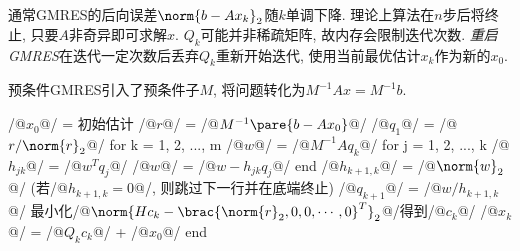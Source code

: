 \documentclass[20pt]{extarticle}
\begin{document}
通常GMRES的后向误差$\norm{b-Ax_k}_2$随$k$单调下降. 理论上算法在$n$步后将终止, 只要$A$非奇异即可求解$x$. $Q_k$可能并非稀疏矩阵, 故内存会限制迭代次数. \emph{重启GMRES}在迭代一定次数后丢弃$Q_k$重新开始迭代, 使用当前最优估计$x_k$作为新的$x_0$.
\par
预条件GMRES引入了预条件子$M$, 将问题转化为$M^{-1}Ax = M^{-1}b$.
\begin{matlablst}
/@$x_0$@/ = 初始估计
/@$r$@/ = /@$M^{-1}\pare{b - Ax_0}$@/
/@$q_1$@/ = /@$r/\norm{r}_2$@/
for k = 1, 2, ..., m
    /@$w$@/ = /@$M^{-1}Aq_k$@/
    for j = 1, 2, ..., k
        /@$h_{jk}$@/ = /@$w^T q_j$@/
        /@$w$@/ = /@$w - h_{jk}q_j$@/
    end
    /@$h_{k+1,k}$@/ = /@$\norm{w}_2$@/ (若/@$h_{k+1,k} = 0$@/, 则跳过下一行并在底端终止)
    /@$q_{k+1}$@/ = /@$w/h_{k+1,k}$@/
    最小化/@$\norm{Hc_k - \brac{\norm{r}_2,0,0,\cdots,0}^T}_2$@/得到/@$c_k$@/
    /@$x_k$@/ = /@$Q_kc_k$@/ + /@$x_0$@/
end
\end{matlablst}



\end{document}
